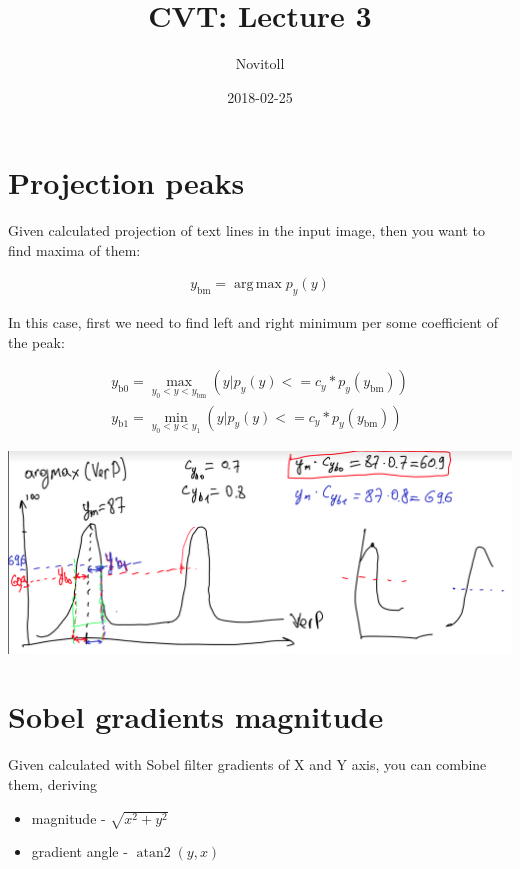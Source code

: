 \documentclass[11pt]{article}
\title{CVT: Lecture 3}
\date{2018-02-25}
\author{Novitoll}
\DeclareMathOperator*{\argmax}{arg\,max}
\DeclareMathOperator{\atantwo}{atan2}
\begin{document}
    \maketitle

    \section{Projection peaks}

    Given calculated projection of text lines in the input image,
    then you want to find maxima of them:

    \begin{align}
        y_{\text{bm}} = \argmax{p_y(y)}
    \end{align}

    In this case, first we need to find left and right minimum per some coefficient of the peak:

    \begin{align}
        y_{\text{b0}} = \max_{y_0 < y < y_{\text{bm}}}(y|p_y(y) <= c_y * p_y(y_{\text{bm}})) \\
        y_{\text{b1}} = \min_{y_0 < y < y_{1}}(y|p_y(y) <= c_y * p_y(y_{\text{bm}}))
    \end{align}

    \includegraphics[scale=0.2]{peaks}

    \section{Sobel gradients magnitude}

    Given calculated with Sobel filter gradients of X and Y axis,
    you can combine them, deriving
    \begin{itemize}
        \item magnitude - $\sqrt{x^2 + y^2}$
        \item gradient angle - $\atantwo(y, x)$
    \end{itemize}
\end{document}
